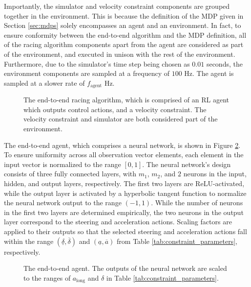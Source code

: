Importantly, the simulator and velocity constraint components are grouped together in the environment.
This is because the definition of the MDP given in Section \ref{sec:mdps} solely encompasses an agent and an environment. 
In fact, to ensure conformity between the end-to-end algorithm and the MDP definition, 
all of the racing algorithm components apart from the agent are considered as part of the environment, and executed in unison with the rest of the environment.
Furthermore, due to the simulator's time step being chosen as $0.01$ seconds, the environment components are sampled at a frequency of $100$ Hz.
The agent is sampled at a slower rate of $f_{\text{agent}}$ Hz.

\begin{figure}[htb!]
    \centering
    
    \caption[The end-to-end driving architecture]{The end-to-end racing algorithm, which is comprised of an RL agent which outputs control actions, and a velocity constraint. The velocity constraint and simulator are both considered part of the environment.}
    \label{fig:end_to_end_architecture}
\end{figure}

The end-to-end agent, which comprises a neural network, is shown in Figure \ref{fig:actor_architecture}.
To ensure uniformity across all observation vector elements, each element in the input vector is normalized to the range $[0,1]$. 
The neural network's design consists of three fully connected layers, with $m_1$, $m_2$, and $2$ neurons in the input, hidden, and output layers, respectively. 
The first two layers are ReLU-activated, while the output layer is activated by a hyperbolic tangent function to normalize the neural network output to the range $(-1,1)$. 
While the number of neurons in the first two layers are determined empirically, the two neurons in the output layer correspond to the steering and acceleration actions. 
Scaling factors are applied to their outputs so that the selected steering and acceleration actions fall within the range $(\underline{\delta}, \overline{\delta})$ and $(\underline{a}, \overline{a})$ from Table \ref{tab:constraint_parameters}, respectively.

\begin{figure}[htb!]
    \centering
    
    \caption[The end-to-end agent]{The end-to-end agent. The outputs of the neural network are scaled to the ranges of $a_{\text{long}}$ and $\delta$ in Table \ref{tab:constraint_parameters}.}
    \label{fig:actor_architecture}
\end{figure}


